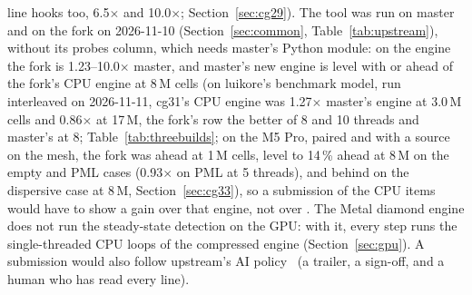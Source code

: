 line hooks too, 6.5$\times$ and 10.0$\times$; Section~\ref{sec:cg29}). The tool was run on master and on the fork
on 2026-11-10 (Section~\ref{sec:common}, Table~\ref{tab:upstream}), without its probes column, which needs master's
Python module: on the  engine the fork is 1.23--10.0$\times$ master, and master's new 
engine is level with or ahead of the fork's CPU engine at 8\,M cells (on luikore's benchmark model, run interleaved
on 2026-11-11, cg31's CPU engine was 1.27$\times$ master's  engine at 3.0\,M cells and 0.86$\times$ at
17\,M, the fork's row the better of 8 and 10 threads and master's at 8; Table~\ref{tab:threebuilds}; on the M5 Pro, paired and with a
source on the mesh, the fork was ahead at 1\,M cells, level to 14\,\% ahead at 8\,M on the empty and PML cases (0.93$\times$ on PML at 5 threads), and behind
on the dispersive case at 8\,M, Section~\ref{sec:cg33}), so a submission of the CPU items would have
to show a gain over that engine, not over . The Metal diamond engine does not run the steady-state detection on the GPU: with it, every step runs
the single-threaded CPU loops of the compressed engine (Section~\ref{sec:gpu}). A submission would also follow
upstream's AI policy~\cite{aipolicy} (a  trailer, a sign-off, and a human who has read every
line).

